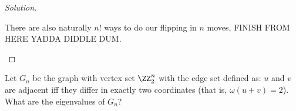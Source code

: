 \documentclass[11pt]{scrartcl}
\begin{document}
\begin{proof}[Solution]
\begin{enumerate}[(i)]
    There are also naturally $n!$ ways to do our flipping in $n$ moves, FINISH FROM HERE YADDA DIDDLE DUM.
\end{enumerate}
\end{proof}
\begin{problem}
    Let $G_n$ be the graph with vertex set $\ZZ_2^n$ with the edge set defined as: $u$ and $v$ are adjacent iff they differ in exactly two coordinates (that is, $\omega(u+v)=2$). What are the eigenvalues of $G_n$?
\end{problem}
\end{document}
